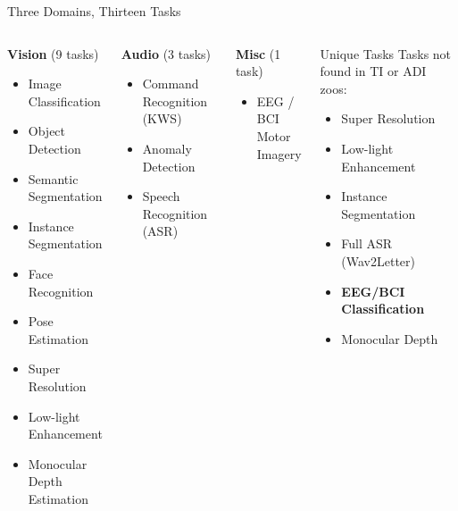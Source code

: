 \documentclass[aspectratio=169]{beamer}
\begin{document}
\begin{frame}{Three Domains, Thirteen Tasks}
  \begin{columns}[T]
      \begin{block}{\textcolor{NXPOrange}{\textbf{Vision}} (9 tasks)}
        \begin{itemize}\scriptsize
          \item Image Classification
          \item Object Detection
          \item Semantic Segmentation
          \item Instance Segmentation
          \item Face Recognition
          \item Pose Estimation
          \item Super Resolution
          \item Low-light Enhancement
          \item Monocular Depth Estimation
        \end{itemize}
      \end{block}
      \begin{block}{\textcolor{NXPBlue}{\textbf{Audio}} (3 tasks)}
        \begin{itemize}\scriptsize
          \item Command Recognition (KWS)
          \item Anomaly Detection
          \item Speech Recognition (ASR)
        \end{itemize}
      \end{block}
      \vspace{6pt}
      \begin{block}{\textcolor{NXPDark}{\textbf{Misc}} (1 task)}
        \begin{itemize}\scriptsize
          \item EEG / BCI\\Motor Imagery
        \end{itemize}
      \end{block}
      \begin{alertblock}{Unique Tasks}
        \scriptsize
        Tasks not found in TI or ADI zoos:
        \begin{itemize}
          \item Super Resolution
          \item Low-light Enhancement
          \item Instance Segmentation
          \item Full ASR (Wav2Letter)
          \item \textbf{EEG/BCI Classification}
          \item Monocular Depth
        \end{itemize}
      \end{alertblock}
  \end{columns}
\end{frame}
\end{document}
